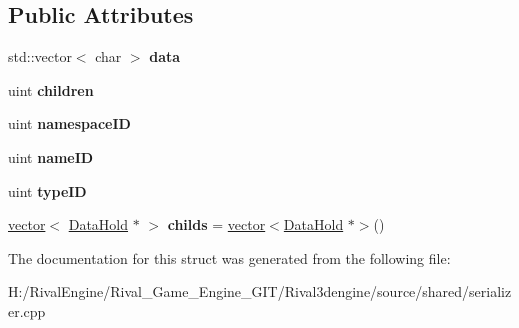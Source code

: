 \subsection*{Public Attributes}
\begin{DoxyCompactItemize}
\item 
\mbox{\label{struct_data_hold_adc5aefe257c77de82fe36f3a020fd0f4}} 
std\+::vector$<$ char $>$ {\bfseries data}
\item 
\mbox{\label{struct_data_hold_ae70f2c9095266585b0be10739b50f581}} 
uint {\bfseries children}
\item 
\mbox{\label{struct_data_hold_a71d617c7ef82c971b937c14ee9010f54}} 
uint {\bfseries namespace\+ID}
\item 
\mbox{\label{struct_data_hold_ae0e671f123d5addeb9b59295f4f3d02e}} 
uint {\bfseries name\+ID}
\item 
\mbox{\label{struct_data_hold_af04a3e28f0cdc424cbdcd44547b7c230}} 
uint {\bfseries type\+ID}
\item 
\mbox{\label{struct_data_hold_a34243d77edd2fcbb68341906a150a667}} 
\hyperlink{structvector}{vector}$<$ \hyperlink{struct_data_hold}{Data\+Hold} $\ast$ $>$ {\bfseries childs} = \hyperlink{structvector}{vector}$<$\hyperlink{struct_data_hold}{Data\+Hold} $\ast$$>$()
\end{DoxyCompactItemize}


The documentation for this struct was generated from the following file\+:\begin{DoxyCompactItemize}
\item 
H\+:/\+Rival\+Engine/\+Rival\+\_\+\+Game\+\_\+\+Engine\+\_\+\+G\+I\+T/\+Rival3dengine/source/shared/serializer.\+cpp\end{DoxyCompactItemize}

